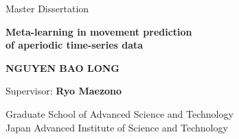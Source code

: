 \begin{titlepage}

\begin{center}

{
    \vfill
    \large Master Dissertation\\[3cm]
}

{
    \LARGE \bfseries Meta-learning in movement prediction\\of aperiodic time-series data\\[3cm]
}

{
    \large \bfseries NGUYEN BAO LONG\\[2cm]
}

\vfill

{
    Supervisor: \textbf{Ryo Maezono}\\[2cm]
}

Graduate School of Advanced Science and Technology\\
Japan Advanced Institute of Science and Technology




\end{center}


    
    
    

\end{titlepage}
